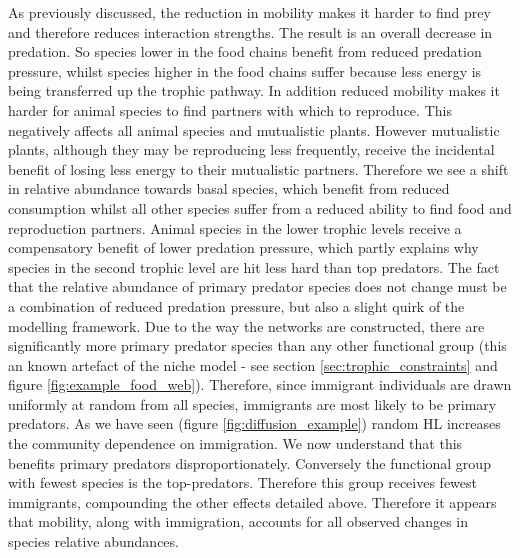 As previously discussed, the reduction in mobility makes it harder to find prey and therefore reduces interaction strengths. The result is an overall decrease in predation. So species lower in the food chains benefit from reduced predation pressure, whilst species higher in the food chains suffer because less energy is being transferred up the trophic pathway. In addition reduced mobility makes it harder for animal species to find partners with which to reproduce. This negatively affects all animal species and mutualistic plants. However mutualistic plants, although they may be reproducing less frequently, receive the incidental benefit of losing less energy to their mutualistic partners.   Therefore we see a shift in relative abundance towards basal species, which benefit from reduced consumption whilst all other species suffer from a reduced ability to find food and reproduction partners. Animal species in the lower trophic levels receive a compensatory benefit of lower predation pressure, which partly explains why species in the second trophic level are hit less hard than top predators. The fact that the relative abundance of primary predator species does not change must be a combination of reduced predation pressure, but also a slight quirk of the modelling framework. Due to the way the networks are constructed, there are significantly more primary predator species than any other functional group (this an known artefact of the niche model - see section \ref{sec:trophic_constraints} and figure \ref{fig:example_food_web}). Therefore, since immigrant individuals are drawn uniformly at random from all species, immigrants are most likely to be primary predators. As we have seen (figure \ref{fig:diffusion_example}) random HL increases the community dependence on immigration. We now understand that this benefits primary predators disproportionately. Conversely the functional group with fewest species is the top-predators. Therefore this group receives fewest immigrants, compounding the other effects detailed above. Therefore it appears that mobility, along with immigration, accounts for all observed changes in species relative abundances.  


